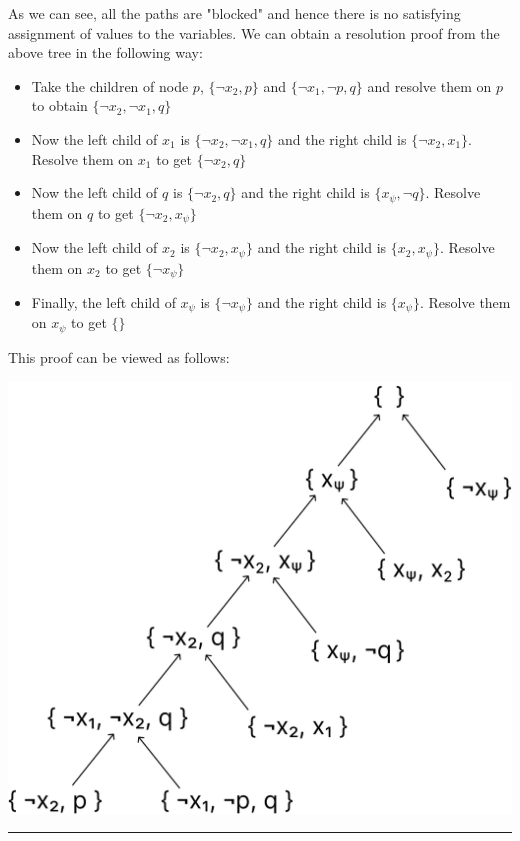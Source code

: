 \documentclass[12pt,letterpaper, onecolumn]{exam}
\begin{document}
\begin{questions}
	As we can see, all the paths are "blocked" and hence there is no satisfying assignment of values to the variables.
	We can obtain a resolution proof from the above tree in the following way:

	\begin{itemize}
		\item Take the children of node $ p $, $ \{ \neg x_2, p \} $ and $ \{\neg x_1, \neg p, q \} $ and resolve them on $ p $ to obtain  $ \{\neg x_2, \neg x_1, q \} $
		\item Now the left child of $ x_1 $ is $ \{\neg x_2, \neg x_1, q \} $ and the right child is $ \{ \neg x_2, x_1 \} $. Resolve them on $ x_1 $ to get $ \{ \neg x_2, q \} $
		\item Now the left child of $ q $ is $ \{ \neg x_2, q \} $ and the right child is $ \{ x_{\psi}, \neg q \} $. Resolve them on $ q $ to get $ \{ \neg x_2, x_{\psi} \} $
		\item Now the left child of $ x_2 $ is $ \{ \neg x_2, x_{\psi} \} $ and the right child is $ \{ x_2, x_{\psi} \} $. Resolve them on $ x_2 $ to get $ \{ \neg x_{\psi} \} $
		\item Finally, the left child of $ x_{\psi} $ is $ \{ \neg x_{\psi} \} $ and the right child is $ \{ x_{\psi} \} $. Resolve them on $ x_{\psi} $ to get $ \{  \} $
	\end{itemize}

	This proof can be viewed as follows:


	\begin{center}
	\includegraphics[scale=0.22]{resolution_proof.png}
	\end{center}


    {\rule{17cm}{0.4pt}}

\end{questions}
\end{document}
